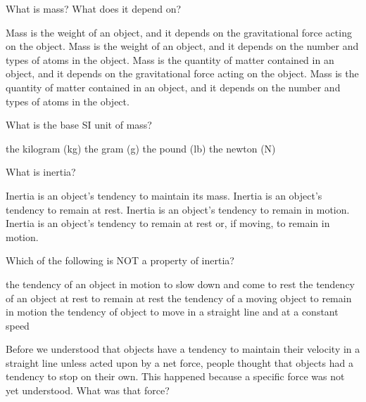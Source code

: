 \documentclass[]{exam}
\begin{document}

\begin{questions}

\question
What is mass? What does it depend on?

\begin{randomizechoices}
    \choice Mass is the weight of an object, and it depends on the gravitational force acting on the object.
    \choice Mass is the weight of an object, and it depends on the number and types of atoms in the object.
    \choice Mass is the quantity of matter contained in an object, and it depends on the gravitational force acting on the object.
    \correctchoice Mass is the quantity of matter contained in an object, and it depends on the number and types of atoms in the object.
\end{randomizechoices}


\question
What is the base SI unit of mass?

\begin{randomizechoices}
    \correctchoice the kilogram (kg)
    \choice the gram (g)
    \choice the pound (lb)
    \choice the newton (N)
\end{randomizechoices}

\question
What is inertia?

\begin{randomizechoices}
    \choice Inertia is an object’s tendency to maintain its mass.
    \choice Inertia is an object’s tendency to remain at rest.
    \choice Inertia is an object’s tendency to remain in motion.
    \correctchoice Inertia is an object’s tendency to remain at rest or, if moving, to remain in motion.
\end{randomizechoices}


\question
Which of the following is NOT a property of inertia?

\begin{randomizechoices}
    \correctchoice the tendency of an object in motion to slow down and come to rest
    \choice the tendency of an object at rest to remain at rest
    \choice the tendency of a moving object to remain in motion
    \choice the tendency of object to move in a straight line and at a constant speed
\end{randomizechoices}

\question
Before we understood that objects have a tendency to maintain their velocity in a straight line unless acted upon by a net force, people thought that objects had a tendency to stop on their own. This happened because a specific force was not yet understood. What was that force?


\end{questions}
\end{document}

